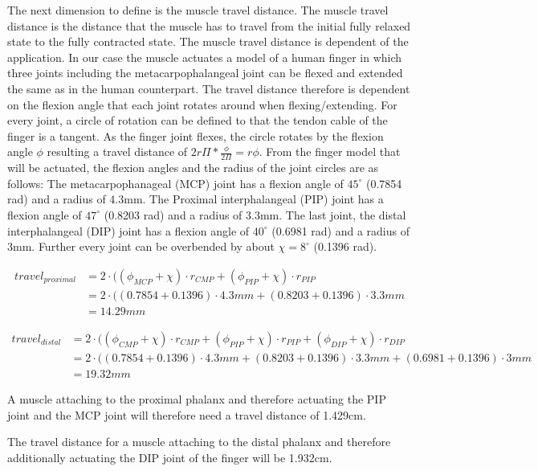 \documentclass[main]{subfiles}
\begin{document}
The next dimension to define is the muscle travel distance. The muscle travel distance is the distance that the muscle has to travel from the initial fully relaxed state to the fully contracted state. The muscle travel distance is dependent of the application. In our case the muscle actuates a model of a human finger in which three joints including the metacarpophalangeal joint can be flexed and extended the same as in the human counterpart. The travel distance therefore is dependent on the flexion angle that each joint rotates around when flexing/extending. For every joint, a circle of rotation can be defined to that the tendon cable of the finger is a tangent. As the finger joint flexes, the circle rotates by the flexion angle $\phi$ resulting a travel distance of $2r\Pi*\frac{\phi}{2\Pi} = r\phi$. From the finger model that will be actuated, the flexion angles and the radius of the joint circles are as follows: The metacarpophanageal (MCP) joint has a flexion angle of $45^\circ$ (0.7854 rad) and a radius of 4.3mm. The Proximal interphalangeal (PIP) joint has a flexion angle of $47^\circ$ (0.8203 rad) and a radius of 3.3mm. The last joint, the distal interphalangeal (DIP) joint has a flexion angle of $40^\circ$ (0.6981 rad) and a radius of 3mm. Further every joint can be overbended by about $\chi = 8^\circ$ (0.1396 rad).


\[
\begin{aligned}
 travel_{proximal} &= 2 \cdot ((\phi_{MCP} + \chi) \cdot r_{CMP} +(\phi_{PIP} + \chi) \cdot r_{PIP} \\
 &= 2 \cdot ((0.7854 + 0.1396) \cdot 4.3mm +(0.8203 + 0.1396) \cdot 3.3mm\\
 &= 14.29 mm
 \end{aligned}
\]

\[
\begin{aligned}
 travel_{distal} &= 2 \cdot ((\phi_{CMP} + \chi) \cdot r_{CMP} +(\phi_{PIP} + \chi) \cdot r_{PIP} + (\phi_{DIP} + \chi) \cdot r_{DIP} \\
 &= 2 \cdot ((0.7854 + 0.1396) \cdot 4.3mm +(0.8203 + 0.1396) \cdot 3.3mm + (0.6981 + 0.1396) \cdot 3mm\\
 &= 19.32 mm
 \end{aligned}
\]

A muscle attaching to the proximal phalanx and therefore actuating the PIP joint and the MCP joint will therefore need a travel distance of 1.429cm.

The travel distance for a muscle attaching to the distal phalanx and therefore additionally actuating the DIP joint of the finger will be 1.932cm.
\end{document}
